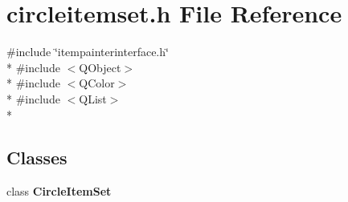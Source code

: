 \section{circleitemset.\+h File Reference}
\label{bk3_2circles_2circleitemset_8h}
{\ttfamily \#include \char`\"{}itempainterinterface.\+h\char`\"{}}\\*
{\ttfamily \#include $<$Q\+Object$>$}\\*
{\ttfamily \#include $<$Q\+Color$>$}\\*
{\ttfamily \#include $<$Q\+List$>$}\\*
\subsection*{Classes}
\begin{DoxyCompactItemize}
\item 
class {\bf Circle\+Item\+Set}
\end{DoxyCompactItemize}
